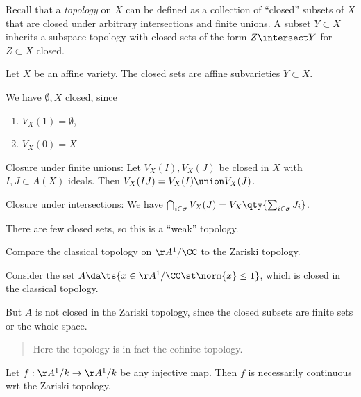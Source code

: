 Recall that a \emph{topology} on \(X\) can be defined as a collection of
``closed'' subsets of \(X\) that are closed under arbitrary
intersections and finite unions. A subset \(Y\subset X\) inherits a
subspace topology with closed sets of the form \(Z\intersect Y\) for
\(Z\subset X\) closed.

\begin{definition}

Let \(X\) be an affine variety. The closed sets are affine subvarieties
\(Y\subset X\).

\end{definition}

We have \(\emptyset, X\) closed, since

\begin{enumerate}
\def\labelenumi{\arabic{enumi}.}
\tightlist
\item
  \(V_X(1) = \emptyset\),
\item
  \(V_X(0) = X\)
\end{enumerate}

Closure under finite unions: Let \(V_X(I), V_X(J)\) be closed in \(X\)
with \(I, J \subset A(X)\) ideals. Then
\(V_X(IJ) = V_X(I) \union V_X(J)\).

Closure under intersections: We have
\(\bigcap_{i\in \sigma} V_X(J) = V_X\qty{ \sum_{i\in \sigma} J_i}\).

\begin{remark}

There are few closed sets, so this is a ``weak'' topology.

\end{remark}

\begin{example}

Compare the classical topology on \(\AA^1/\CC\) to the Zariski topology.

Consider the set \(A\da \ts{x\in \AA^1/\CC \st \norm{x} \leq 1}\), which
is closed in the classical topology.

But \(A\) is not closed in the Zariski topology, since the closed
subsets are finite sets or the whole space.

\begin{quote}
Here the topology is in fact the cofinite topology.
\end{quote}

\end{example}

\begin{example}

Let \(f: \AA^1/k\to \AA^1/k\) be any injective map. Then \(f\) is
necessarily continuous wrt the Zariski topology.

\end{example}

